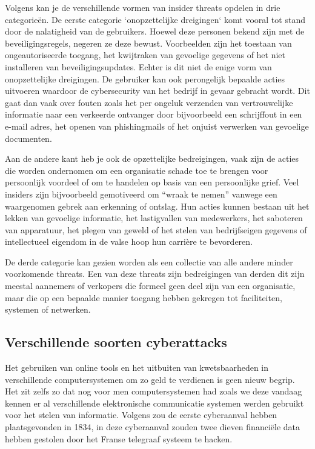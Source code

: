 Volgens \textcite{Cisa2025} kan je de verschillende vormen van insider threats opdelen in drie categorieën. De eerste categorie `onopzettelijke dreigingen` komt vooral tot stand door de nalatigheid van de gebruikers.  Hoewel deze personen bekend zijn met de beveiligingsregels, negeren ze deze bewust. Voorbeelden zijn het toestaan van ongeautoriseerde toegang, het kwijtraken van gevoelige gegevens of het niet installeren van beveiligingsupdates. Echter is dit niet de enige vorm van onopzettelijke dreigingen. De gebruiker kan ook perongelijk bepaalde acties uitvoeren waardoor de cybersecurity van het bedrijf in gevaar gebracht wordt. Dit gaat dan vaak over fouten zoals het per ongeluk verzenden van vertrouwelijke informatie naar een verkeerde ontvanger door bijvoorbeeld een schrijffout in een e-mail adres, het openen van phishingmails of het onjuist verwerken van gevoelige documenten.

Aan de andere kant heb je ook de opzettelijke bedreigingen, vaak zijn de acties die worden ondernomen om een organisatie schade toe te brengen voor persoonlijk voordeel of om te handelen op basis van een persoonlijke grief. Veel insiders zijn bijvoorbeeld gemotiveerd om “wraak te nemen” vanwege een waargenomen gebrek aan erkenning of ontslag. Hun acties kunnen bestaan uit het lekken van gevoelige informatie, het lastigvallen van medewerkers, het saboteren van apparatuur, het plegen van geweld of het stelen van bedrijfseigen gegevens of intellectueel eigendom in de valse hoop hun carrière te bevorderen.\autocite{Cisa2025}

De derde categorie kan gezien worden als een collectie van alle andere minder voorkomende threats. Een van deze threats zijn bedreigingen van derden dit zijn meestal aannemers of verkopers die formeel geen deel zijn van een organisatie, maar die op een bepaalde manier toegang hebben gekregen tot faciliteiten, systemen of netwerken. \autocite{Cisa2025}



\subsection{Verschillende soorten cyberattacks}
Het gebruiken van online tools en het uitbuiten van kwetsbaarheden in verschillende computersystemen om zo geld te verdienen is geen nieuw begrip. Het zit zelfs zo dat nog voor men computersystemen had zoals we deze vandaag kennen er al verschillende elektronische communicatie systemen werden gebruikt voor het stelen van informatie. Volgens \textcite{Monroe2025} zou de eerste cyberaanval hebben plaatsgevonden in 1834, in deze cyberaanval zouden twee dieven financiële data hebben gestolen door het Franse telegraaf systeem te hacken. 

